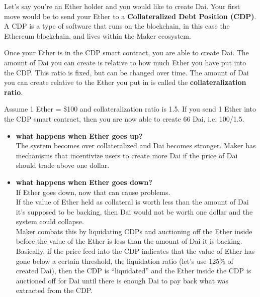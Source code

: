 Let's say you're an Ether holder and you would like to create Dai. Your first move would be to send your Ether to a \textbf{Collateralized Debt Position (CDP)}. A CDP is a type of software that runs on the blockchain, in this case the Ethereum blockchain, and lives within the Maker ecosystem.

Once your Ether is in the CDP smart contract, you are able to create Dai. The amount of Dai you can create is relative to how much Ether you have put into the CDP. This ratio is fixed, but can be changed over time. The amount of Dai you can create relative to the Ether you put in is called the \textbf{collateralization ratio}.

Assume 1 Ether = \$100 and collateralization ratio is 1.5. If you send 1 Ether into the CDP smart contract, then you are now able to create 66 Dai, i.e. 100/1.5.

\begin{itemize}
    \item \textbf{what happens when Ether goes up?}\\
    The system becomes over collateralized and Dai becomes stronger.
    Maker has mechanisms that incentivize users to create more Dai if the price of Dai should trade above one dollar.
    \item \textbf{what happens when Ether goes down?}\\
    If Ether goes down, now that can cause problems.\\
    If the value of Ether held as collateral is worth less than the amount of Dai it's supposed to be backing, then Dai would not be worth one dollar and the system could collapse.\\
    Maker combats this by liquidating CDPs and auctioning off the Ether inside before the value of the Ether is less than the amount of Dai it is backing.\\
    Basically, if the price feed into the CDP indicates that the value of Ether has gone below a certain threshold, the liquidation ratio (let's use 125\% of created Dai), then the CDP is ``liquidated'' and the Ether inside the CDP is auctioned off for Dai until there is enough Dai to pay back what was extracted from the CDP.
\end{itemize}

